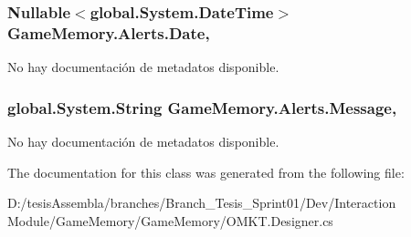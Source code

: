 \hypertarget{class_game_memory_1_1_alerts_a9f7acf9c7a5e7248df9a8c2c2f841ca9}{
\subsubsection[{Date}]{\setlength{\rightskip}{0pt plus 5cm}Nullable$<$global.\-System.\-Date\-Time$>$ Game\-Memory.\-Alerts.\-Date\hspace{0.3cm}{\ttfamily [get]}, {\ttfamily [set]}}}\label{class_game_memory_1_1_alerts_a9f7acf9c7a5e7248df9a8c2c2f841ca9}


No hay documentación de metadatos disponible. 

\hypertarget{class_game_memory_1_1_alerts_a52f59bb44b174d6c60521a9d226a4cf8}{
\subsubsection[{Message}]{\setlength{\rightskip}{0pt plus 5cm}global.\-System.\-String Game\-Memory.\-Alerts.\-Message\hspace{0.3cm}{\ttfamily [get]}, {\ttfamily [set]}}}\label{class_game_memory_1_1_alerts_a52f59bb44b174d6c60521a9d226a4cf8}


No hay documentación de metadatos disponible. 



The documentation for this class was generated from the following file\-:\begin{DoxyCompactItemize}
\item 
D\-:/tesis\-Assembla/branches/\-Branch\-\_\-\-Tesis\-\_\-\-Sprint01/\-Dev/\-Interaction Module/\-Game\-Memory/\-Game\-Memory/O\-M\-K\-T.\-Designer.\-cs\end{DoxyCompactItemize}
